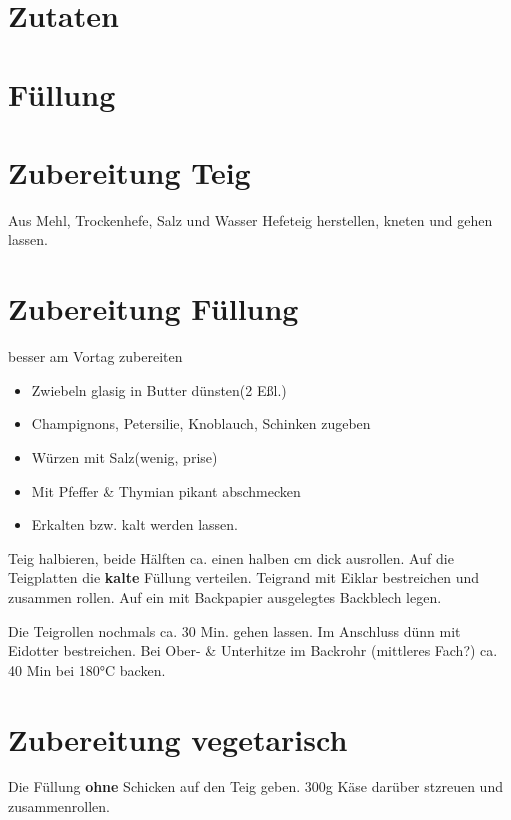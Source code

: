 \section{Zutaten}


\section{Füllung}


\section{Zubereitung Teig}
Aus Mehl, Trockenhefe,
Salz und Wasser Hefeteig herstellen,
kneten und gehen lassen.

\section{Zubereitung Füllung}
besser am Vortag zubereiten

\begin{itemize}
	\item Zwiebeln glasig in Butter dünsten(2 Eßl.)
	\item Champignons, Petersilie, Knoblauch, Schinken zugeben
	\item Würzen mit Salz(wenig, prise)
	\item Mit Pfeffer \& Thymian pikant abschmecken
	\item Erkalten bzw. kalt werden lassen.
\end{itemize}

Teig halbieren, beide Hälften ca. einen halben cm dick ausrollen.
Auf die Teigplatten die  \textbf{kalte} Füllung verteilen.
Teigrand mit Eiklar bestreichen und zusammen rollen.
Auf ein mit Backpapier ausgelegtes Backblech legen.

\begin{flushleft}
	Die Teigrollen nochmals ca. 30 Min. gehen lassen.
	Im Anschluss dünn mit Eidotter bestreichen.
	Bei Ober-  \& Unterhitze im Backrohr (mittleres Fach?)
	ca. 40 Min bei 180°C backen.
\end{flushleft}

\section{Zubereitung vegetarisch}
Die Füllung  \textbf{ohne} Schicken auf den Teig geben. 300g Käse
darüber stzreuen und zusammenrollen.
